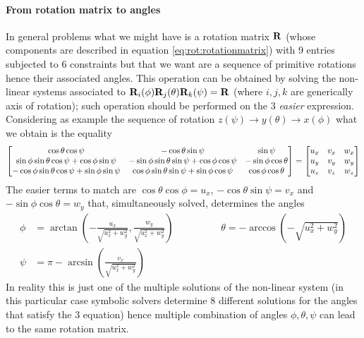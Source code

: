 		\paragraph{From rotation matrix to angles} In general problems what we might have is a rotation matrix $\mathbf{R}$ (whose components are described in equation \ref{eq:rot:rotationmatrix}) with 9 entries subjected to 6 constraints but that we want are a sequence of primitive rotations hence their associated angles. This operation can be obtained by solving the non-linear systems associated to $\mathbf{R}_i(\phi) \mathbf{R}_j(\theta) \mathbf{R}_k(\psi) = \mathbf{R}$ (where $i,j,k$ are generically axis of rotation); such operation should be performed on the 3 \textit{easier} expression. Considering as example the sequence of rotation $z(\psi) \rightarrow y(\theta) \rightarrow x (\phi)$ what we obtain is the equality
		\[ \begin{bmatrix} \cos \theta \cos\psi & -\cos\theta \sin \psi & \sin\psi \\
		\sin\phi\sin\theta\cos\psi + \cos\phi \sin\psi & -\sin\phi\sin\theta\sin\psi + \cos\phi\cos\psi & -  \sin\phi\cos\theta \\
		-\cos\phi \sin\theta\cos\psi + \sin\phi\sin\psi & \cos\phi \sin\theta\sin\psi + \sin\phi\cos\psi & \cos\phi\cos\theta   \end{bmatrix} = \begin{bmatrix}  u_x  &  v_x & w_x \\ u_y  &  v_y & w_y \\ u_z  &  v_z & w_z  \end{bmatrix} \]
		The easier terms to match are $\cos\theta \cos\phi = u_x$, $-\cos\theta\sin \psi = v_x$ and $-\sin\phi\cos\theta = w_y$ that, simultaneously solved, determines the angles
		\begin{equation}
		\begin{split}
			\phi & = \arctan\left( - \frac{u_x}{\sqrt{u_x^2+w_y^2}}, \frac{w_y}{\sqrt{u_x^2 + w_y^2}} \right) \hspace{2cm} \theta = -\arccos\left( - \sqrt{u_x^2 + w_y^2} \right) \\			
			\psi &= \pi - \arcsin \left(\frac{v_x}{\sqrt{u_x^2 + w_y^2}}\right)
		\end{split}
		\end{equation}
		In reality this is just one of the multiple solutions of the non-linear system (in this particular case symbolic solvers determine 8 different solutions for the angles that satisfy the 3 equation) hence multiple combination of angles $\phi,\theta,\psi$ can lead to the same rotation matrix.
		
